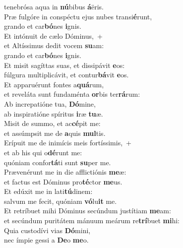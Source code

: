 \oddverse tenebrósa aqua in \textbf{nú}bibus \textbf{á}ëris.\\
\evenverse Præ fulgóre in conspéctu ejus nubes transi\textbf{é}runt,~\*\\
\evenverse grando et car\textbf{bó}nes \textbf{i}gnis.\\
\oddverse Et intónuit de cælo Dóminus,~+\\
\oddverse  et Altíssimus dedit vocem \textbf{su}am:~\*\\
\oddverse grando et car\textbf{bó}nes \textbf{i}gnis.\\
\evenverse Et misit sagíttas suas, et dissipávit \textbf{e}os:~\*\\
\evenverse fúlgura multiplicávit, et contur\textbf{bá}vit \textbf{e}os.\\
\oddverse Et apparuérunt fontes a\textbf{quá}rum,~\*\\
\oddverse et reveláta sunt fundaménta \textbf{or}bis ter\textbf{rá}rum:\\
\evenverse Ab increpatióne tua, \textbf{Dó}mine,~\*\\
\evenverse ab inspiratióne spíritus \textbf{i}ræ \textbf{tu}æ.\\
\oddverse Misit de summo, et ac\textbf{cé}pit me:~\*\\
\oddverse et assúmpsit me de \textbf{a}quis \textbf{mul}tis.\\
\evenverse Erípuit me de inimícis meis fortíssimis,~+\\
\evenverse  et ab his qui o\textbf{dé}runt me:~\*\\
\evenverse quóniam confor\textbf{tá}ti sunt \textbf{su}per me.\\
\oddverse Prævenérunt me in die afflictiónis \textbf{me}æ:~\*\\
\oddverse et factus est Dóminus pro\textbf{té}ctor \textbf{me}us.\\
\evenverse Et edúxit me in lati\textbf{tú}dinem:~\*\\
\evenverse salvum me fecit, quóniam \textbf{vó}lu\textbf{it} me.\\
\oddverse Et retríbuet mihi Dóminus secúndum justítiam \textbf{me}am:~\*\\
\oddverse et secúndum puritátem mánuum meárum re\textbf{trí}buet \textbf{mi}hi:\\
\evenverse Quia custodívi vias \textbf{Dó}mini,~\*\\
\evenverse nec ímpie gessi a \textbf{De}o \textbf{me}o.\\
